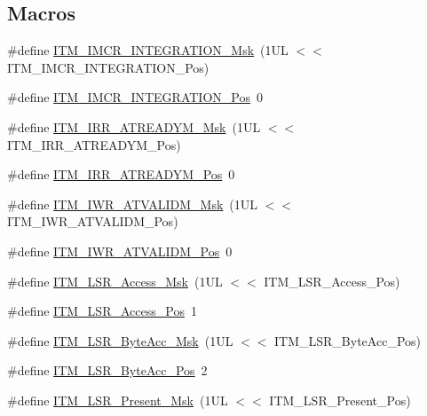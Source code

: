 \subsection*{Macros}
\begin{DoxyCompactItemize}
\item 
\#define \hyperlink{group__CMSIS__ITM_ga8838bd3dd04c1a6be97cd946364a3fd2}{I\+T\+M\+\_\+\+I\+M\+C\+R\+\_\+\+I\+N\+T\+E\+G\+R\+A\+T\+I\+O\+N\+\_\+\+Msk}~(1\+U\+L $<$$<$ I\+T\+M\+\_\+\+I\+M\+C\+R\+\_\+\+I\+N\+T\+E\+G\+R\+A\+T\+I\+O\+N\+\_\+\+Pos)
\item 
\#define \hyperlink{group__CMSIS__ITM_ga08de02bf32caf48aaa29f7c68ff5d755}{I\+T\+M\+\_\+\+I\+M\+C\+R\+\_\+\+I\+N\+T\+E\+G\+R\+A\+T\+I\+O\+N\+\_\+\+Pos}~0
\item 
\#define \hyperlink{group__CMSIS__ITM_ga3dbc3e15f5bde2669cd8121a1fe419b9}{I\+T\+M\+\_\+\+I\+R\+R\+\_\+\+A\+T\+R\+E\+A\+D\+Y\+M\+\_\+\+Msk}~(1\+U\+L $<$$<$ I\+T\+M\+\_\+\+I\+R\+R\+\_\+\+A\+T\+R\+E\+A\+D\+Y\+M\+\_\+\+Pos)
\item 
\#define \hyperlink{group__CMSIS__ITM_ga259edfd1d2e877a62e06d7a240df97f4}{I\+T\+M\+\_\+\+I\+R\+R\+\_\+\+A\+T\+R\+E\+A\+D\+Y\+M\+\_\+\+Pos}~0
\item 
\#define \hyperlink{group__CMSIS__ITM_ga67b969f8f04ed15886727788f0e2ffd7}{I\+T\+M\+\_\+\+I\+W\+R\+\_\+\+A\+T\+V\+A\+L\+I\+D\+M\+\_\+\+Msk}~(1\+U\+L $<$$<$ I\+T\+M\+\_\+\+I\+W\+R\+\_\+\+A\+T\+V\+A\+L\+I\+D\+M\+\_\+\+Pos)
\item 
\#define \hyperlink{group__CMSIS__ITM_ga04d3f842ad48f6a9127b4cecc963e1d7}{I\+T\+M\+\_\+\+I\+W\+R\+\_\+\+A\+T\+V\+A\+L\+I\+D\+M\+\_\+\+Pos}~0
\item 
\#define \hyperlink{group__CMSIS__ITM_gac8ae69f11c0311da226c0c8ec40b3d37}{I\+T\+M\+\_\+\+L\+S\+R\+\_\+\+Access\+\_\+\+Msk}~(1\+U\+L $<$$<$ I\+T\+M\+\_\+\+L\+S\+R\+\_\+\+Access\+\_\+\+Pos)
\item 
\#define \hyperlink{group__CMSIS__ITM_ga144a49e12b83ad9809fdd2769094fdc0}{I\+T\+M\+\_\+\+L\+S\+R\+\_\+\+Access\+\_\+\+Pos}~1
\item 
\#define \hyperlink{group__CMSIS__ITM_ga91f492b2891bb8b7eac5b58de7b220f4}{I\+T\+M\+\_\+\+L\+S\+R\+\_\+\+Byte\+Acc\+\_\+\+Msk}~(1\+U\+L $<$$<$ I\+T\+M\+\_\+\+L\+S\+R\+\_\+\+Byte\+Acc\+\_\+\+Pos)
\item 
\#define \hyperlink{group__CMSIS__ITM_gabfae3e570edc8759597311ed6dfb478e}{I\+T\+M\+\_\+\+L\+S\+R\+\_\+\+Byte\+Acc\+\_\+\+Pos}~2
\item 
\#define \hyperlink{group__CMSIS__ITM_gaa5bc2a7f5f1d69ff819531f5508bb017}{I\+T\+M\+\_\+\+L\+S\+R\+\_\+\+Present\+\_\+\+Msk}~(1\+U\+L $<$$<$ I\+T\+M\+\_\+\+L\+S\+R\+\_\+\+Present\+\_\+\+Pos)

\end{DoxyCompactItemize}
